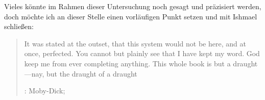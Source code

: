 Vieles könnte im Rahmen dieser Untersuchung noch gesagt und präzisiert werden,
doch möchte ich an dieser Stelle einen vorläufigen Punkt setzen und mit Ishmael
schließen: \foreignblockquote{english}[{: Moby-Dick;
\cite[159]{melville:mobydick}}]{It was stated at the outset, that this system
would not be here, and at once, perfected. You cannot but plainly see that I
have kept my word.
\textelp{}
God keep me from ever completing anything. This whole book is but a
draught---nay, but the draught of a draught}. %
